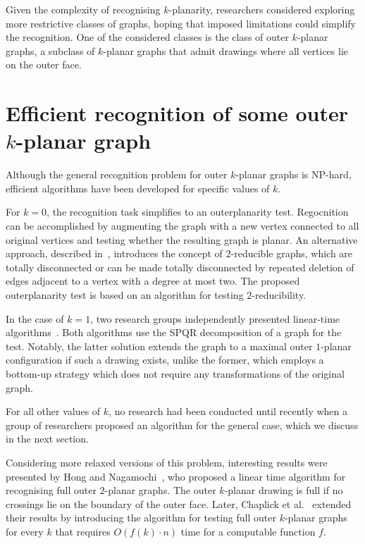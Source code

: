 Given the complexity of recognising \(k\)-planarity, researchers considered exploring more restrictive classes of graphs, hoping that imposed limitations could simplify the recognition. One of the considered classes is the class of outer \(k\)-planar graphs, a subclass of \(k\)-planar graphs that admit drawings where all vertices lie on the outer face.

\section{Efficient recognition of some outer \(k\)-planar graph}\label{sec:efficient-recognition-of-some-outer-(k)-planar-graph}

Although the general recognition problem for outer \(k\)-planar graphs is NP-hard, efficient algorithms have been developed for specific values of \(k\).

For \(k = 0\), the recognition task simplifies to an outerplanarity test. Regocnition can be accomplished by augmenting the graph with a new vertex connected to all original vertices and testing whether the resulting graph is planar. An alternative approach, described in~\cite{linear-op}, introduces the concept of \(2\)-reducible graphs, which are totally disconnected or can be made totally disconnected by repeated deletion of edges adjacent to a vertex with a degree at most two. The proposed outerplanarity test is based on an algorithm for testing \(2\)-reducibility.

In the case of \(k = 1\), two research groups independently presented linear-time algorithms~\cite{linear-o1p_, linear-o1p}. Both algorithms use the SPQR decomposition of a graph for the test. Notably, the latter solution extends the graph to a maximal outer \(1\)-planar configuration if such a drawing exists, unlike the former, which employs a bottom-up strategy which does not require any transformations of the original graph.

For all other values of \(k\), no research had been conducted until recently when a group of researchers proposed an algorithm for the general case, which we discuss in the next section.

Considering more relaxed versions of this problem, interesting results were presented by Hong and Nagamochi~\cite{linear-full-o2p}, who proposed a linear time algorithm for recognising full outer \(2\)-planar graphs. The outer \(k\)-planar drawing is full if no crossings lie on the boundary of the outer face. Later, Chaplick et al.~\cite{linear-full-okp} extended their results by introducing the algorithm for testing full outer \(k\)-planar graphs for every \(k\) that requires \(O(f(k) \cdot n)\) time for a computable function \(f\).

